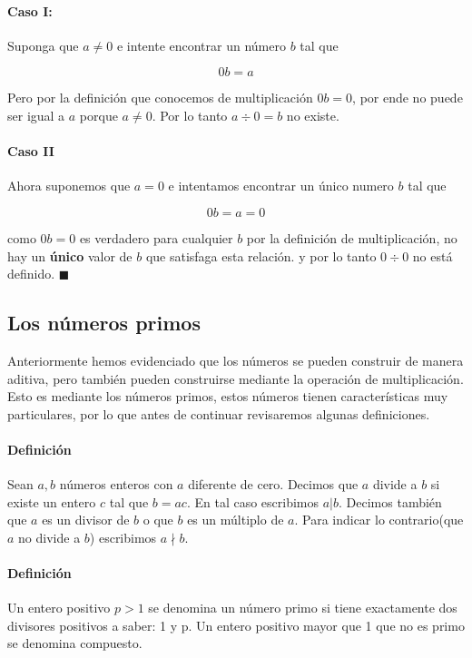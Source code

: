 \documentclass{article}
\begin{document}
\paragraph{Caso I:} Suponga que $a \neq 0$ e intente encontrar un número $b$ tal que

$$0b = a$$

Pero por la definición que conocemos de multiplicación $0b = 0$, por ende no puede ser igual a $a$ porque $a \neq 0$. Por lo tanto $a \div 0 = b$ no existe.

\paragraph{Caso II} Ahora suponemos que $a = 0$ e intentamos encontrar un único numero $b$ tal que 

$$0b = a = 0$$

como $0b = 0$ es verdadero para cualquier $b$ por la definición de multiplicación, no hay un \textbf{único} valor de $b$ que satisfaga esta relación. y por lo tanto $0 \div 0$ no está definido. $\blacksquare$

\subsection{Los números primos} Anteriormente hemos evidenciado que los números se pueden construir de manera aditiva, pero también pueden construirse mediante la operación de multiplicación. Esto es mediante los números primos, estos números tienen características muy particulares, por lo que antes de continuar revisaremos algunas definiciones.

\paragraph{Definición} Sean $a,b$ números enteros con $a$ diferente de cero. Decimos que $a$ divide a $b$ si existe un entero $c$ tal que $b=ac$. En tal caso escribimos $a|b$. Decimos también que $a$ es un divisor de $b$ o que $b$ es un múltiplo de $a$. Para indicar lo contrario(que $a$ no divide a $b$) escribimos $a \nmid b$.

\paragraph{Definición} Un entero positivo $p > 1$ se denomina un número primo si tiene exactamente dos divisores positivos a saber: 1 y p. Un entero positivo mayor que 1 que no es primo se denomina compuesto.
\end{document}
